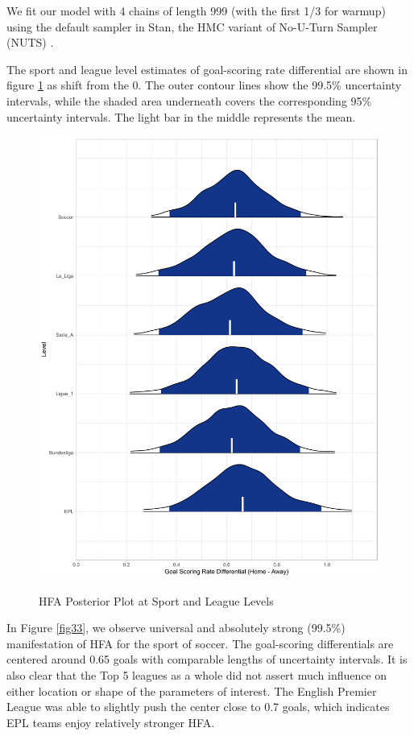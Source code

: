 \documentclass[USenglish]{article}
\begin{document}
We fit our model with 4 chains of length 999 (with the first 1/3 for warmup) using the default sampler in Stan, the HMC variant of No-U-Turn Sampler (NUTS) \citep{Hoffman2014}.  

The sport and league level estimates of goal-scoring rate differential are shown in figure \ref{fig31} as shift from the 0. The outer contour lines show the 99.5\% uncertainty intervals, while the shaded area underneath covers the corresponding 95\% uncertainty intervals. The light bar in the middle represents the mean.

\begin{figure}
\caption{HFA Posterior Plot at Sport and League Levels}
\centering
{\includegraphics[width=1.00\linewidth]{HFA32.pdf}}
\label{fig31}
\end{figure}

In Figure \ref{fig33}, we observe universal and absolutely strong (99.5\%) manifestation of HFA for the sport of soccer. The goal-scoring differentials are centered around 0.65 goals with comparable lengths of uncertainty intervals.  
It is also clear that the Top 5 leagues as a whole did not assert much influence on either location or shape of the parameters of interest. The English Premier League was able to slightly push the center close to 0.7 goals, which indicates EPL teams enjoy relatively stronger HFA.
\end{document}
